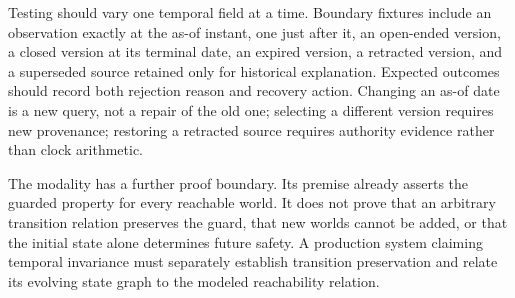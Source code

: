 Testing should vary one temporal field at a time. Boundary fixtures include an observation exactly at the as-of instant, one just after it, an open-ended version, a closed version at its terminal date, an expired version, a retracted version, and a superseded source retained only for historical explanation. Expected outcomes should record both rejection reason and recovery action. Changing an as-of date is a new query, not a repair of the old one; selecting a different version requires new provenance; restoring a retracted source requires authority evidence rather than clock arithmetic.

The modality has a further proof boundary. Its premise already asserts the guarded property for every reachable world. It does not prove that an arbitrary transition relation preserves the guard, that new worlds cannot be added, or that the initial state alone determines future safety. A production system claiming temporal invariance must separately establish transition preservation and relate its evolving state graph to the modeled reachability relation.
